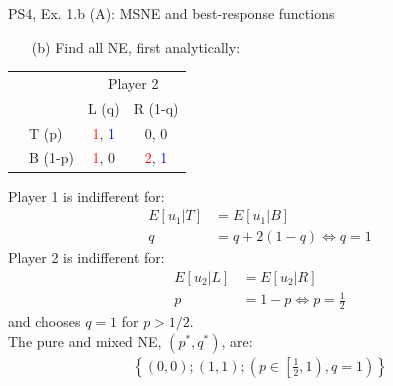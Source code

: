 \begin{frame}{PS4, Ex. 1.b (A): MSNE and best-response functions}
  \begin{multicols}{2}
    \begin{itemize}
      \item[(b)] Find all NE, first analytically:
    \end{itemize}
    \vspace{-8pt}
    \begin{table}
      \begin{tabular}{cl|c|c|}
        & \multicolumn{1}{c}{} & \multicolumn{2}{c}{\color{blue}Player 2}\\
        \parbox[t]{1mm}{}
        &  &  &  \\
        & T (p) & \textcolor{red}{1}, \textcolor{blue}{1} & 0, 0 \\
        & B (1-p) & \textcolor{red}{1}, 0 & \textcolor{red}{2}, \textcolor{blue}{1} \\
      \end{tabular}
    \end{table}
    Player 1 is indifferent for:
    \begin{align*}
      E[u_1|T]&=E[u_1|B]\\
      q &= q + 2(1-q) \Leftrightarrow q = 1
    \end{align*}
    Player 2 is indifferent for:
    \begin{align*}
      E[u_2|L]&=E[u_2|R]\\
      p &= 1-p \Leftrightarrow p = \frac{1}{2}
    \end{align*}
    and chooses $q=1$ for $p>1/2$.\\\medskip
    The pure and mixed NE, $(p^{*},q^{*})$, are:
    \begin{align*}
      \left\{(0,0);(1,1);\left(p\in\left[\frac{1}{2},1\right),q=1\right)\right\}
    \end{align*}
  \vfill\null \columnbreak
  \vfill\null
  \end{multicols}
\end{frame}
